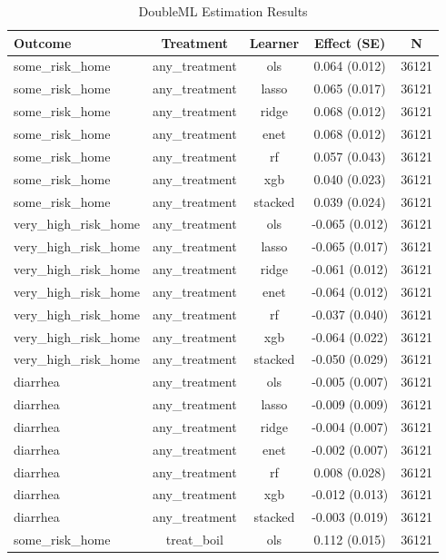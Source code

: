 \begin{table}[htbp]
\centering
\caption{DoubleML Estimation Results}
\label{tab:results}
\begin{tabular}{lcccc}
\hline
Outcome & Treatment & Learner & Effect (SE) & N \\
\hline
some_risk_home & any_treatment & ols & 0.064 (0.012) & 36121 \\
some_risk_home & any_treatment & lasso & 0.065 (0.017) & 36121 \\
some_risk_home & any_treatment & ridge & 0.068 (0.012) & 36121 \\
some_risk_home & any_treatment & enet & 0.068 (0.012) & 36121 \\
some_risk_home & any_treatment & rf & 0.057 (0.043) & 36121 \\
some_risk_home & any_treatment & xgb & 0.040 (0.023) & 36121 \\
some_risk_home & any_treatment & stacked & 0.039 (0.024) & 36121 \\
very_high_risk_home & any_treatment & ols & -0.065 (0.012) & 36121 \\
very_high_risk_home & any_treatment & lasso & -0.065 (0.017) & 36121 \\
very_high_risk_home & any_treatment & ridge & -0.061 (0.012) & 36121 \\
very_high_risk_home & any_treatment & enet & -0.064 (0.012) & 36121 \\
very_high_risk_home & any_treatment & rf & -0.037 (0.040) & 36121 \\
very_high_risk_home & any_treatment & xgb & -0.064 (0.022) & 36121 \\
very_high_risk_home & any_treatment & stacked & -0.050 (0.029) & 36121 \\
diarrhea & any_treatment & ols & -0.005 (0.007) & 36121 \\
diarrhea & any_treatment & lasso & -0.009 (0.009) & 36121 \\
diarrhea & any_treatment & ridge & -0.004 (0.007) & 36121 \\
diarrhea & any_treatment & enet & -0.002 (0.007) & 36121 \\
diarrhea & any_treatment & rf & 0.008 (0.028) & 36121 \\
diarrhea & any_treatment & xgb & -0.012 (0.013) & 36121 \\
diarrhea & any_treatment & stacked & -0.003 (0.019) & 36121 \\
some_risk_home & treat_boil & ols & 0.112 (0.015) & 36121 \\

\end{tabular}
\end{table}
